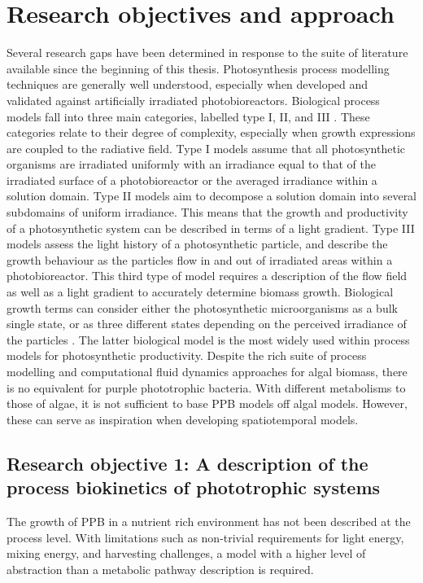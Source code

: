 \section{Research objectives and approach}
\label{Intro:Objectives}
Several research gaps have been determined in response to the suite of literature available since the beginning of this thesis. Photosynthesis process modelling techniques are generally well understood, especially when developed and validated against artificially irradiated photobioreactors. Biological process models fall into three main categories, labelled type I, II, and III \cite{Bechet2013}. These categories relate to their degree of complexity, especially when growth expressions are coupled to the radiative field. Type I models assume that all photosynthetic organisms are irradiated uniformly with an irradiance equal to that of the irradiated surface of a photobioreactor or the averaged irradiance within a solution domain. Type II models aim to decompose a solution domain into several subdomains of uniform irradiance. This means that the growth and productivity of a photosynthetic system can be described in terms of a light gradient. Type III models assess the light history of a photosynthetic particle, and describe the growth behaviour as the particles flow in and out of irradiated areas within a photobioreactor. This third type of model requires a description of the flow field as well as a light gradient to accurately determine biomass growth. Biological growth terms can consider either the photosynthetic microorganisms as a bulk single state, or as three different states depending on the perceived irradiance of the particles \cite{Eilers1988}. The latter biological model is the most widely used within process models for photosynthetic productivity. Despite the rich suite of process modelling and computational fluid dynamics approaches for algal biomass, there is no equivalent for purple phototrophic bacteria. With different metabolisms to those of algae, it is not sufficient to base PPB models off algal models. However, these can serve as inspiration when developing spatiotemporal models.

\subsection{Research objective 1: A description of the process biokinetics of phototrophic systems}
The growth of PPB in a nutrient rich environment has not been described at the process level. With limitations such as non-trivial requirements for light energy, mixing energy, and harvesting challenges, a model with a higher level of abstraction than a metabolic pathway description is required. 

